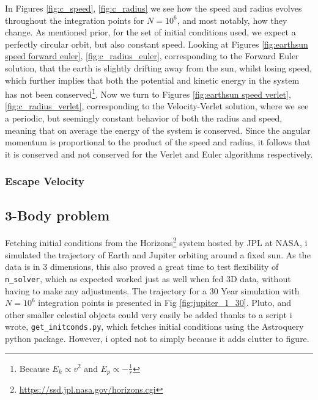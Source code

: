 \documentclass[10pt,showpacs,preprintnumbers,amsmath,amssymb,nofootinbib,aps,prl,twocolumn,groupedaddress,superscriptaddress,showkeys]{revtex4-1}
\begin{document}
    In Figures \ref{fig:c_speed}, \ref{fig:c_radius} we see how the speed and radius evolves throughout the integration points for $N=10^6$, and most notably, how they change. As mentioned prior, for the set of initial conditions used, we expect a perfectly circular orbit, but also constant speed. Looking at Figures \ref{fig:earthsun speed forward euler}, \ref{fig:c_radius_euler}, corresponding to the Forward Euler solution, that the earth is slightly drifting away from the sun, whilst losing speed, which further implies that both the potential and kinetic energy in the system has not been conserved\footnote{Because $E_k \propto v^2$ and $E_p\propto -\frac{1}{r}$}. Now we turn to Figures \ref{fig:earthsun speed verlet}, \ref{fig:c_radius_verlet}, corresponding to the Velocity-Verlet solution, where we see a periodic, but seemingly constant behavior of both the radius and speed, meaning that on average the energy of the system is conserved. Since the angular momentum is proportional to the product of the speed and radius, it follows that it is conserved and not conserved for the Verlet and Euler algorithms respectively.

    \subsubsection{Escape Velocity}

\subsection{3-Body problem}
  Fetching initial conditions from the Horizons\footnote{\url{https://ssd.jpl.nasa.gov/horizons.cgi}} system hosted by JPL at NASA, i simulated the trajectory of Earth and Jupiter orbiting around a fixed sun. As the data is in 3 dimensions, this also proved a great time to test flexibility of \lstinline{n_solver}, which as expected worked just as well when fed 3D data, without having to make any adjustments. The trajectory for a 30 Year simulation with $N=10^6$ integration points is presented in Fig \ref{fig:jupiter_1_30}. Pluto, and other smaller celestial objects could very easily be added thanks to a script i wrote, \lstinline{get_initconds.py}, which fetches initial conditions using the Astroquery python package. However, i opted not to simply because it adds clutter to figure.
\end{document}
